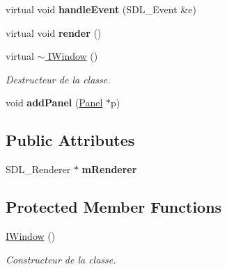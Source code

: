 \begin{DoxyCompactItemize}
\mbox{\label{classIWindow_aaf7f1a0aae8cf30b55e9988964a5b29a}} 
virtual void {\bfseries handle\+Event} (S\+D\+L\+\_\+\+Event \&e)
\item 
\mbox{\label{classIWindow_afea1a24de020bd661057610a2748ed45}} 
virtual void {\bfseries render} ()
\item 
\mbox{\label{classIWindow_a6098cfe62d8de7bb9361c95d8f1b62fe}} 
virtual \hyperlink{classIWindow_a6098cfe62d8de7bb9361c95d8f1b62fe}{$\sim$ I\+Window} ()
\begin{DoxyCompactList}\small\item\em Destructeur de la classe. \end{DoxyCompactList}\item 
\mbox{\label{classIWindow_a22b65a6cc55adfd164e85e1a48d4ac7d}} 
void {\bfseries add\+Panel} (\hyperlink{classPanel}{Panel} $\ast$p)
\end{DoxyCompactItemize}
\subsection*{Public Attributes}
\begin{DoxyCompactItemize}
\item 
\mbox{\label{classIWindow_a828ec3ebd41f0153af4b9a5ae7204e0b}} 
S\+D\+L\+\_\+\+Renderer $\ast$ {\bfseries m\+Renderer}
\end{DoxyCompactItemize}
\subsection*{Protected Member Functions}
\begin{DoxyCompactItemize}
\item 
\mbox{\label{classIWindow_adf3153080a13461d5fb95ee753a03a63}} 
\hyperlink{classIWindow_adf3153080a13461d5fb95ee753a03a63}{I\+Window} ()
\begin{DoxyCompactList}\small\item\em Constructeur de la classe. \end{DoxyCompactList}\end{DoxyCompactItemize}
